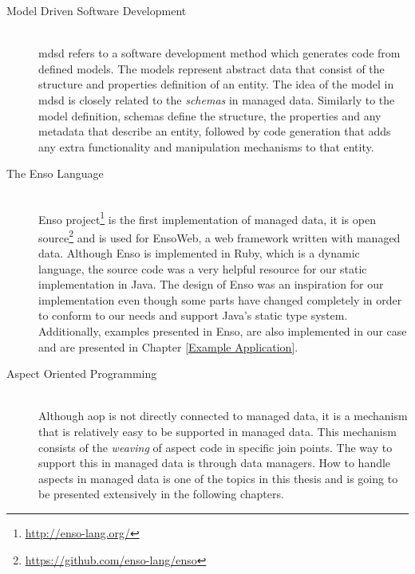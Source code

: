 \begin{description}
  \item[Model Driven Software Development]~\\
  \ac{mdsd} refers to a software development method which generates code from defined models. 
  The models represent abstract data that consist of the structure and properties definition of an entity.
  The idea of the model in \ac{mdsd} is closely related to the \textit{schemas} in managed data.
  Similarly to the model definition, schemas define the structure, the properties and any metadata that describe an entity, followed by code generation that adds any extra functionality and manipulation mechanisms to that entity.

  \item[The Enso Language]~\\
  Enso project\footnote{\url{http://enso-lang.org/}} is the first implementation of managed data, 
  it is open source\footnote{\url{https://github.com/enso-lang/enso}} and is used for EnsoWeb, a web framework written with managed data.
  Although Enso is implemented in Ruby, which is a dynamic language, the source code was a very helpful resource for our static implementation in Java. 
  The design of Enso was an inspiration for our implementation even though some parts have changed completely in order to conform to our needs and support Java's static type system.
  Additionally, examples presented in Enso, are also implemented in our case and are presented in Chapter \ref{Example Application}.

  \item[Aspect Oriented Programming]~\\
  Although \ac{aop} is not directly connected to managed data, it is a mechanism that is relatively easy to be supported in managed data.
  This mechanism consists of the \textit{weaving} of aspect code in specific join points. 
  The way to support this in managed data is through data managers. 
  How to handle aspects in managed data is one of the topics in this thesis and is going to be presented extensively in the following chapters.

\end{description}

